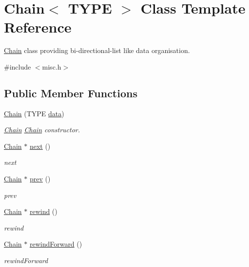 \hypertarget{classChain}{}\section{Chain$<$ T\+Y\+P\+E $>$ Class Template Reference}
\label{classChain}


\hyperlink{classChain}{Chain} class providing bi-\/directional-\/list like data organisation.  




{\ttfamily \#include $<$misc.\+h$>$}

\subsection*{Public Member Functions}
\begin{DoxyCompactItemize}
\item 
\hyperlink{classChain_a6e1b54f58b90218127399007e2be651a}{Chain} (T\+Y\+P\+E \hyperlink{classChain_aeb9b72f09201d5553bb04e25593dc7fa}{data})
\begin{DoxyCompactList}\small\item\em \hyperlink{classChain}{Chain} \hyperlink{classChain}{Chain} constructor. \end{DoxyCompactList}\item 
\hyperlink{classChain}{Chain} $\ast$ \hyperlink{classChain_a16411e8032aa4e0464d04d12f69577da}{next} ()
\begin{DoxyCompactList}\small\item\em next \end{DoxyCompactList}\item 
\hyperlink{classChain}{Chain} $\ast$ \hyperlink{classChain_a33dc961c1b75bdad1920680c56a7d52f}{prev} ()
\begin{DoxyCompactList}\small\item\em prev \end{DoxyCompactList}\item 
\hyperlink{classChain}{Chain} $\ast$ \hyperlink{classChain_a3251fcea46affc01835a565a0dcff0f6}{rewind} ()
\begin{DoxyCompactList}\small\item\em rewind \end{DoxyCompactList}\item 
\hyperlink{classChain}{Chain} $\ast$ \hyperlink{classChain_a83b9c24f7e9425bc4876f42833ff25d2}{rewind\+Forward} ()
\begin{DoxyCompactList}\small\item\em rewind\+Forward \end{DoxyCompactList}\item 

\end{DoxyCompactItemize}
